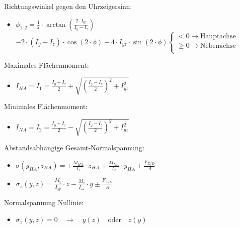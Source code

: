 \documentclass[10pt,a4paper,landscape, hidelinks]{article}
\begin{document}
\begin{multicols*}{3}
Richtungswinkel gegen den Uhrzeigersinn:
\begin{itemize}[leftmargin=*]
        \item [] $\phi_{1;2}=\frac{1}{2}\cdot\arctan\left(\frac{2\cdot I_{yz}}{I_y-I_z}\right)$
        \begin{math}
                -2\cdot(I_y-I_z)\cdot\cos(2\cdot\phi)-4\cdot I_{yz}\cdot\sin(2\cdot\phi)
                \begin{cases}
                        <0\rightarrow\text{Hauptachse}\\
                        \ge0\rightarrow\text{Nebenachse}\\
                \end{cases}
        \end{math}
\end{itemize}

Maximales Flächenmoment:
\begin{itemize}[leftmargin=*]
        \item [] $I_{HA}=I_1=\frac{I_y+I_z}{2}+\sqrt{\left(\frac{I_y-I_z}{2}\right)^2+I_{yz}^2}$
\end{itemize}

Minimales Flächenmoment:
\begin{itemize}[leftmargin=*]
        \item [] $I_{NA}=I_2=\frac{I_y+I_z}{2}-\sqrt{\left(\frac{I_y-I_z}{2}\right)^2+I_{yz}^2}$
\end{itemize}

Abstandsabhängige Gesamt-Normalspannung:
\begin{itemize}[leftmargin=*]
        \item [] $\sigma(y_{HA},z_{HA})=\pm\frac{M_{HA}}{I_1}\cdot z_{HA}\pm\frac{M_{NA}}{I_2}\cdot y_{HA}\pm\frac{F_{Z/D}}{A}$
        \item [] $\sigma_x(y,z)=\frac{M_y}{I_{yy}}\cdot z-\frac{M_z}{I_{zz}}\cdot y\pm\frac{F_{Z/D}}{A}$
\end{itemize}

Normalspannung Nullinie:
\begin{itemize}[leftmargin=*]
        \item [] $\sigma_x(y,z)=0\quad\longrightarrow\quad y(z)\quad\text{oder}\quad z(y)$
\end{itemize}


\end{multicols*}
\end{document}
